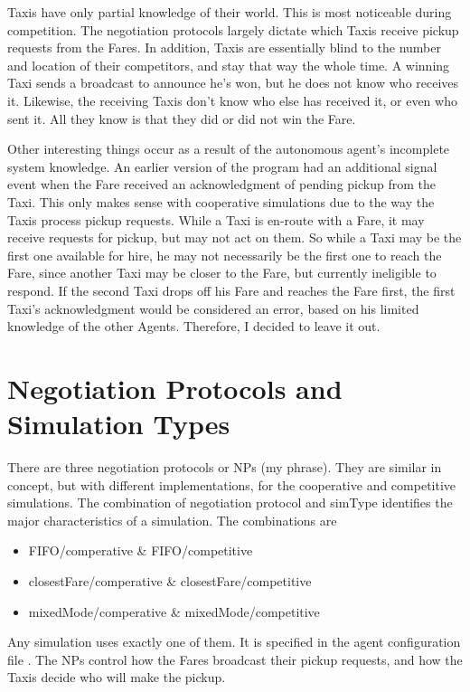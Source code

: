 \documentclass[11pt,letterpaper,onecolumn,twoside,openright,final]{report}
\begin{document}
Taxis have only partial knowledge of their world.
This is most noticeable during competition.
The negotiation protocols largely dictate which Taxis receive pickup requests from the Fares.
In addition, Taxis are essentially blind to the number and location of their competitors, and stay that way the whole time.
A winning Taxi sends a broadcast to announce he's won, but he does not know who receives it.
Likewise, the receiving Taxis don't know who else has received it, or even who sent it.
All they know is that they did or did not win the Fare.

Other interesting things occur as a result of the autonomous agent's incomplete system knowledge.
An earlier version of the program had an additional signal event when the Fare received an acknowledgment of pending pickup from the Taxi.
This only makes sense with cooperative simulations due to the way the Taxis process pickup requests.
While a Taxi is en-route with a Fare, it may receive requests for pickup, but may not act on them.
So while a Taxi may be the first one available for hire, he may not necessarily be the first one to reach the Fare, since another Taxi may be closer to the Fare, but currently ineligible to respond.
If the second Taxi drops off his Fare and reaches the Fare first, the first Taxi's acknowledgment would be considered an error, based on his limited knowledge of the other Agents.
Therefore, I decided to leave it out.

\section{Negotiation Protocols and Simulation Types}
There are three negotiation protocols or NPs (my phrase).
They are similar in concept, but with different implementations, for the cooperative and competitive simulations.
The combination of negotiation protocol and simType identifies the major characteristics of a simulation.
The combinations are

\begin{itemize}
  \item{FIFO/comperative \& FIFO/competitive}
  \item{closestFare/comperative \& closestFare/competitive}
  \item{mixedMode/comperative \& mixedMode/competitive}
\end{itemize}

Any simulation uses exactly one of them.
It is specified in the agent configuration file .
The NPs control how the Fares broadcast their pickup requests, and how the Taxis decide who will make the pickup.
\end{document}
